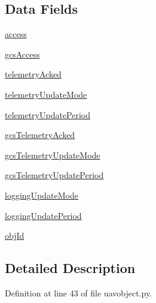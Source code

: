 \subsection*{\-Data \-Fields}
\begin{DoxyCompactItemize}
\item 
\hyperlink{classuavobject_1_1_u_a_v_object_metadata_ab53e59b97cf3d8bca5b07088a60ba40f}{access}
\item 
\hyperlink{classuavobject_1_1_u_a_v_object_metadata_af0b8488a4c8bb1a50bbac806f22bf656}{gcs\-Access}
\item 
\hyperlink{classuavobject_1_1_u_a_v_object_metadata_a6db603de03ffee19a9d87a5fcb3e061a}{telemetry\-Acked}
\item 
\hyperlink{classuavobject_1_1_u_a_v_object_metadata_a69cc9ce6fccdbdddc4d84594fc1f9b17}{telemetry\-Update\-Mode}
\item 
\hyperlink{classuavobject_1_1_u_a_v_object_metadata_a83392d1f62434b4421bb27a5557b7436}{telemetry\-Update\-Period}
\item 
\hyperlink{classuavobject_1_1_u_a_v_object_metadata_ac5e05f3b4b83c639c727a5e4729fc879}{gcs\-Telemetry\-Acked}
\item 
\hyperlink{classuavobject_1_1_u_a_v_object_metadata_ab479d0f584976724f6b22b15ceb62b8f}{gcs\-Telemetry\-Update\-Mode}
\item 
\hyperlink{classuavobject_1_1_u_a_v_object_metadata_a7ac85bf7eacc9bf93cb67c02a348c5d5}{gcs\-Telemetry\-Update\-Period}
\item 
\hyperlink{classuavobject_1_1_u_a_v_object_metadata_a1eb245c4c691dcf5bd245d13c76b10e2}{logging\-Update\-Mode}
\item 
\hyperlink{classuavobject_1_1_u_a_v_object_metadata_a42d69560bb4cd54063892f566a7d4b1d}{logging\-Update\-Period}
\item 
\hyperlink{classuavobject_1_1_u_a_v_object_metadata_afdb35886b9b80c3d0c14039310ab7023}{obj\-Id}
\end{DoxyCompactItemize}


\subsection{\-Detailed \-Description}


\-Definition at line 43 of file uavobject.\-py.



